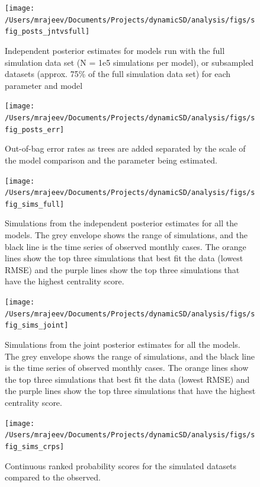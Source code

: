 \documentclass[
]{book}
\begin{document}
\begin{figure}
\texttt{[image: /Users/mrajeev/Documents/Projects/dynamicSD/analysis/figs/sfig\_posts\_jntvsfull]} \caption{Independent posterior estimates for models run with the full simulation data set (N = 1e5 simulations per model), or subsampled datasets (approx. 75\% of the full simulation data set) for each parameter and model}\label{fig:sfig-posts-jntvsfull}
\end{figure}



\begin{figure}
\texttt{[image: /Users/mrajeev/Documents/Projects/dynamicSD/analysis/figs/sfig\_posts\_err]} \caption{Out-of-bag error rates as trees are added separated by the scale of the model comparison and the parameter being estimated.}\label{fig:sfig-posts-err}
\end{figure}



\begin{figure}
\texttt{[image: /Users/mrajeev/Documents/Projects/dynamicSD/analysis/figs/sfig\_sims\_full]} \caption{Simulations from the independent posterior estimates for all the models. The grey envelope shows the range of simulations, and the black line is the time series of observed monthly cases. The orange lines show the top three simulations that best fit the data (lowest RMSE) and the purple lines show the top three simulations that have the highest centrality score.}\label{fig:sfig-sims-full}
\end{figure}



\begin{figure}
\texttt{[image: /Users/mrajeev/Documents/Projects/dynamicSD/analysis/figs/sfig\_sims\_joint]} \caption{Simulations from the joint posterior estimates for all the models. The grey envelope shows the range of simulations, and the black line is the time series of observed monthly cases. The orange lines show the top three simulations that best fit the data (lowest RMSE) and the purple lines show the top three simulations that have the highest centrality score.}\label{fig:sfig-sims-joint}
\end{figure}



\begin{figure}
\texttt{[image: /Users/mrajeev/Documents/Projects/dynamicSD/analysis/figs/sfig\_sims\_crps]} \caption{Continuous ranked probability scores for the simulated datasets compared to the observed.}\label{fig:sfig-sims-crps}
\end{figure}
\end{document}
